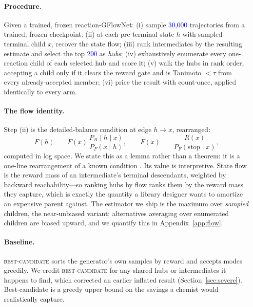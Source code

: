 \documentclass{article}
\newcommand{\checkval}[1]{\textcolor{blue}{#1}}
\begin{document}
\paragraph{Procedure.}
Given a trained, frozen reaction-GFlowNet:
(i) sample \checkval{30{,}000} trajectories from a trained, frozen checkpoint; (ii) at each pre-terminal state $h$ with sampled terminal child $x$, recover the state flow; (iii) rank intermediates by the resulting estimate and select the top \checkval{200} as \emph{hubs}; (iv) exhaustively enumerate every one-reaction child of each selected hub and score it; (v) walk the hubs in rank order, accepting a child only if it clears the reward gate and is Tanimoto $<\tau$ from every already-accepted member; (vi) price the result with count-once, applied identically to every arm.

\paragraph{The flow identity.}
Step (ii) is the detailed-balance condition at edge $h \to x$, rearranged:
\begin{equation}
F(h) \;=\; F(x)\,\frac{P_B(h \mid x)}{P_F(x \mid h)},
\qquad
F(x) \;=\; \frac{R(x)}{P_F(\text{stop} \mid x)},
\end{equation}
computed in log space. We state this as a lemma rather than a theorem: it is a one-line rearrangement of a known condition \citep{bengio2023gflownetfoundations,malkin2022trajectorybalance}. Its value is
interpretive. State flow is the reward mass of an intermediate's terminal descendants, weighted by backward reachability---so ranking hubs by flow ranks them by the reward mass they capture, which is exactly the quantity a library designer wants to amortize an expensive parent against. The estimator we ship is the maximum over \emph{sampled} children, the near-unbiased variant; alternatives averaging over enumerated children are biased upward, and we quantify this in Appendix~\ref{app:flow}.

\paragraph{Baseline.}
\textsc{best-candidate} sorts the generator's own samples by reward and accepts modes greedily. We credit \textsc{best-candidate} for any shared hubs or intermediates it happens to find, which corrected an earlier inflated result (Section~\ref{sec:severe}). Best-candidate is a greedy upper bound on the savings a chemist would realistically capture.
\end{document}
